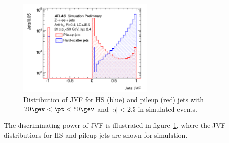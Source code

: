 \begin{figure}[h]
    \centering
    \includegraphics[width=0.6\textwidth]{fig/reconstruction/JVF_plot.pdf}
    \caption[]{Distribution of JVF for HS (blue) and pileup (red) jets
    with $20\gev<\pt<50\gev$ and $|\eta| < 2.5$ in simulated \zjets events.~\cite{bib:ATLAS-CONF-2013-083}}
\label{chap:reconstruction:fig:jvf}
\end{figure}

The discriminating power of JVF is illustrated in
figure~\ref{chap:reconstruction:fig:jvf}, where the JVF distributions
for HS and pileup jets are shown for \zjets simulation. 





